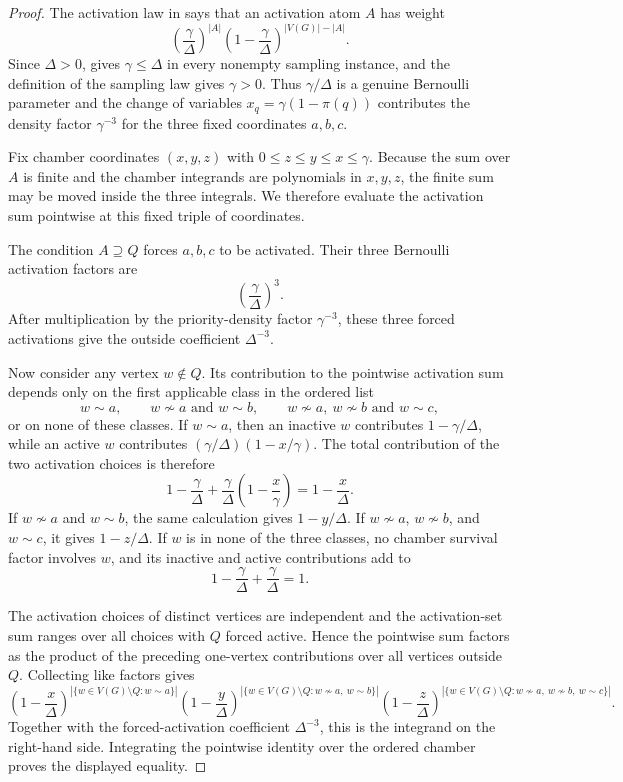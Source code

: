 \begin{proof}
The activation law in  says that an
activation atom $A$ has weight
\[
\left(\frac{\gamma}{\Delta}\right)^{|A|}
\left(1-\frac{\gamma}{\Delta}\right)^{|V(G)|-|A|}.
\]
Since $\Delta>0$,  gives
$\gamma\le\Delta$ in every nonempty sampling instance, and the definition of
the sampling law gives $\gamma>0$.  Thus $\gamma/\Delta$ is a genuine
Bernoulli parameter and the change of variables
$x_q=\gamma(1-\pi(q))$ contributes the density factor $\gamma^{-3}$ for the
three fixed coordinates $a,b,c$.

Fix chamber coordinates $(x,y,z)$ with $0\le z\le y\le x\le\gamma$.  Because
the sum over $A$ is finite and the chamber integrands are polynomials in
$x,y,z$, the finite sum may be moved inside the three integrals.  We therefore
evaluate the activation sum pointwise at this fixed triple of coordinates.

The condition $A\supseteq Q$ forces $a,b,c$ to be activated.  Their three
Bernoulli activation factors are
\[
\left(\frac{\gamma}{\Delta}\right)^3.
\]
After multiplication by the priority-density factor $\gamma^{-3}$, these
three forced activations give the outside coefficient $\Delta^{-3}$.

Now consider any vertex $w\notin Q$.  Its contribution to the pointwise
activation sum depends only on the first applicable class in the ordered list
\[
w\sim a,\qquad
w\not\sim a\text{ and }w\sim b,\qquad
w\not\sim a,\ w\not\sim b\text{ and }w\sim c,
\]
or on none of these classes.  If $w\sim a$, then an inactive $w$ contributes
$1-\gamma/\Delta$, while an active $w$ contributes
$(\gamma/\Delta)(1-x/\gamma)$.  The total contribution of the two activation
choices is therefore
\[
1-\frac{\gamma}{\Delta}
+\frac{\gamma}{\Delta}\left(1-\frac{x}{\gamma}\right)
=1-\frac{x}{\Delta}.
\]
If $w\not\sim a$ and $w\sim b$, the same calculation gives
$1-y/\Delta$.  If $w\not\sim a$, $w\not\sim b$, and $w\sim c$, it gives
$1-z/\Delta$.  If $w$ is in none of the three classes, no chamber survival
factor involves $w$, and its inactive and active contributions add to
\[
1-\frac{\gamma}{\Delta}+\frac{\gamma}{\Delta}=1.
\]

The activation choices of distinct vertices are independent and the
activation-set sum ranges over all choices with $Q$ forced active.  Hence the
pointwise sum factors as the product of the preceding one-vertex
contributions over all vertices outside $Q$.  Collecting like factors gives
\[
\left(1-\frac{x}{\Delta}\right)^{|\{w\in V(G)\setminus Q:w\sim a\}|}
\left(1-\frac{y}{\Delta}\right)^{|\{w\in V(G)\setminus Q:w\not\sim a,\ w\sim b\}|}
\left(1-\frac{z}{\Delta}\right)^{|\{w\in V(G)\setminus Q:w\not\sim a,\ w\not\sim b,\ w\sim c\}|}.
\]
Together with the forced-activation coefficient $\Delta^{-3}$, this is the
integrand on the right-hand side.  Integrating the pointwise identity over the
ordered chamber proves the displayed equality.
\end{proof}
